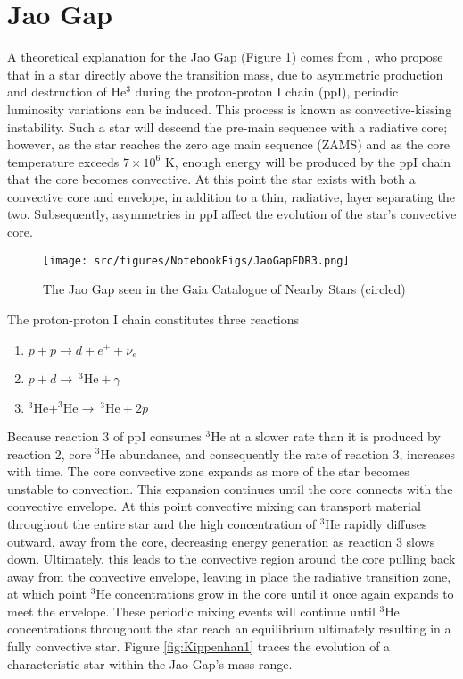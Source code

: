 \section{Jao Gap}\label{sec:JaoGap}
A theoretical explanation for the Jao Gap (Figure \ref{fig:JaoGap}) comes from
\citet{van2012}, who propose that in a star directly above the transition mass,
due to asymmetric production and destruction of He$^{3}$ during the
proton-proton I chain (ppI), periodic luminosity variations can be induced.
This process is known as convective-kissing instability. Such a star will
descend the pre-main sequence with a radiative core; however, as the star
reaches the zero age main sequence (ZAMS) and as the core temperature exceeds
$7\times 10^{6}$ K, enough energy will be produced by the ppI chain that the
core becomes convective. At this point the star exists with both a convective
core and envelope, in addition to a thin, radiative, layer separating the two.
Subsequently, asymmetries in ppI affect the evolution of the star's convective
core.

\begin{figure}
	\centering
	\texttt{[image: src/figures/NotebookFigs/JaoGapEDR3.png]}
	\caption{The Jao Gap seen in the Gaia Catalogue of Nearby Stars (circled)}
	\label{fig:JaoGap}
\end{figure}

The proton-proton I chain constitutes three reactions 
\begin{enumerate} 
	\item $p + p \longrightarrow d + e^{+} + \nu_{e}$
	\item $p + d \longrightarrow \ ^{3}\text{He} + \gamma$
	\item $^{3}\text{He} + ^{3}\text{He} \longrightarrow \ ^{3}\text{He} + 2p$ 
\end{enumerate} 
Because reaction 3 of ppI consumes $^{3}$He at a slower rate than it is
produced by reaction 2, core $^{3}$He abundance, and consequently the rate of
reaction 3, increases with time. The core convective zone expands as more of
the star becomes unstable to convection. This expansion continues until the
core connects with the convective envelope. At this point convective mixing can
transport material throughout the entire star and the high concentration
of $^{3}$He rapidly diffuses outward, away from the core, decreasing energy
generation as reaction 3 slows down. Ultimately, this leads to the convective
region around the core pulling back away from the convective envelope, leaving
in place the radiative transition zone, at which point $^{3}$He concentrations
grow in the core until it once again expands to meet the envelope.  These
periodic mixing events will continue until $^{3}$He concentrations throughout
the star reach an equilibrium ultimately resulting in a fully convective star.
Figure \ref{fig:Kippenhan1} traces the evolution of a characteristic star
within the Jao Gap's mass range.

